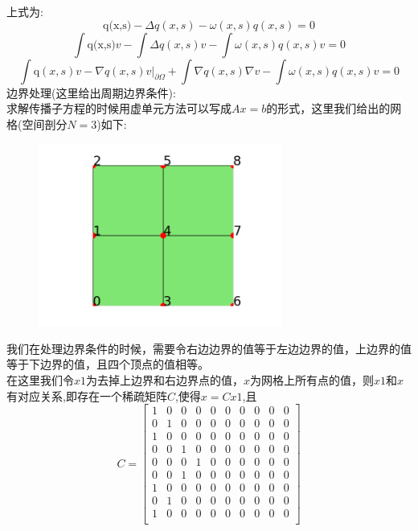 \documentclass[12pt]{article}
\begin{document}
\begin{CJK}{UTF8}{gkai}
  上式为:\\
\begin{equation}
 \text{\.{q}(x,s)} -\Delta q(x,s)-\omega(x,s)q(x,s)=0
\end{equation}
\begin{equation}
\int\text{\.{q}(x,s)}v -\int\Delta q(x,s)v-\int\omega(x,s)q(x,s)v = 0
\end{equation}
\begin{equation}
\int\text{\.{q}}(x,s)v -\nabla q(x,s) v|_{\partial \Omega}+\int \nabla q(x,s)\nabla v-\int\omega(x,s)q(x,s)v = 0
\end{equation}
边界处理(这里给出周期边界条件):\\
求解传播子方程的时候用虚单元方法可以写成$Ax=b$的形式，这里我们给出的网格(空间剖分$N=3$)如下:
\begin{figure}[H]
	\centering
	\includegraphics[width=8cm]{wangge.png}
	\caption{}  		
\end{figure}
我们在处理边界条件的时候，需要令右边边界的值等于左边边界的值，上边界的值等于下边界的值，且四个顶点的值相等。\\

在这里我们令$x1$为去掉上边界和右边界点的值，$x$为网格上所有点的值，则$x1$和$x$有对应关系,即存在一个稀疏矩阵$C$,使得$x=Cx1$,且\\
$$
C=\left[\begin{matrix}
	1&0&0&0&0&0&0&0&0&0 \\
	0&1&0&0&0&0&0&0&0&0  \\
	1&0&0&0&0&0&0&0&0&0  \\
	0&0&1&0&0&0&0&0&0&0    \\
	0&0&0&1&0&0&0&0&0&0   \\
	0&0&1&0&0&0&0&0&0&0   \\
	1&0&0&0&0&0&0&0&0&0  \\
	0&1&0&0&0&0&0&0&0&0  \\
	1&0&0&0&0&0&0&0&0&0 \\
\end{matrix}\right]
$$ 


\end{CJK}
\end{document}
